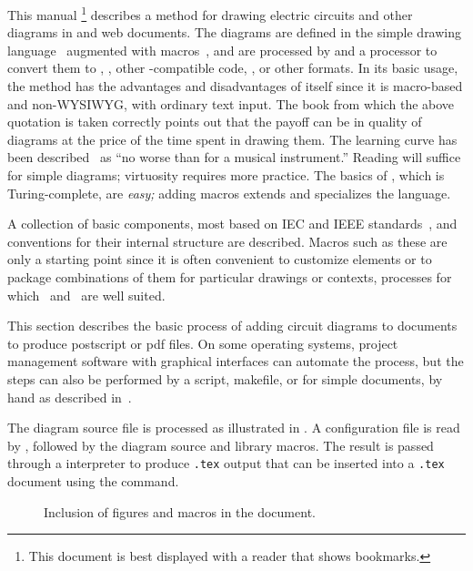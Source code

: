 This manual%
\footnote{This document is best displayed with a reader that shows bookmarks.}
describes a method for drawing electric circuits and
other diagrams in \latex and web documents.
The diagrams are defined in the simple \pic drawing language~\cite{KRpic}
augmented with \Mfour macros~\cite{KRm4,GnuM4}, and are
processed by \Mfour and a \pic processor to
convert them to \TPGF, \PSTricks, other \latex-compatible code, \SVG,
or other formats.
In its basic usage, the method has the advantages and disadvantages of
\tex itself since it is macro-based and non-WYSIWYG,
with ordinary text input.  The book from which the above quotation
is taken correctly points out that the payoff can be in quality of
diagrams at the price of the time spent in drawing them.
The learning curve has been described~\cite{Salvaire25} as
``no worse than for a musical instrument.''
Reading  will suffice for simple diagrams;
virtuosity requires more practice.
The basics of \pic, which is Turing-complete, are {\em easy;}
adding macros extends and specializes the language.

A collection of basic components, most based on IEC and IEEE
standards~\cite{IECstd,IEEEstd},
and conventions for their internal
structure are described.  Macros such as these are only a starting
point since it is often convenient to customize elements or to package
combinations of them for particular drawings or contexts,
processes for which \Mfour\ and \pic\ are well suited.

This section describes the basic process of adding circuit diagrams to
\latex documents to produce postscript or pdf files.  On some operating
systems, project management software with graphical interfaces can
automate the process, but the steps can also be performed by a script,
makefile, or for simple documents, by hand as described in~.

The diagram source file is processed as illustrated in
.  A configuration file is read by \Mfour,
followed by the diagram source and library macros.
The result is passed through a
\pic interpreter to produce {\tt .tex} output that can be inserted
into a {\tt .tex} document using the \verb|| command.

\begin{figure}[ht]
 \caption{Inclusion of figures and macros in the \latex document.
 \label{Flowdiag}}
 \end{figure}

